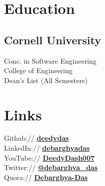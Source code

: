 \documentclass[letterpaper]{deedy-resume} %
\begin{document}
\begin{minipage}[t]{0.33\textwidth} %


\section{Education} 

\subsection{Cornell University}


\sectionspace %

Conc. in Software Engineering \\
College of Engineering \\
Dean's List (All Semesters) \\

\sectionspace %

 


\section{Links} 

Github:// \href{https://github.com/deedydas}{\bf deedydas} \\
LinkedIn:// \href{https://www.linkedin.com/in/debarghyadas}{\bf debarghyadas} \\
YouTube:// \href{https://www.youtube.com/user/DeedyDash007}{\bf DeedyDash007} \\
Twitter:// \href{https://twitter.com/debarghya_das}{\bf @debarghya\_das} \\
Quora:// \href{https://www.quora.com/Debarghya-Das}{\bf Debarghya-Das}


\end{minipage}
\end{document}
